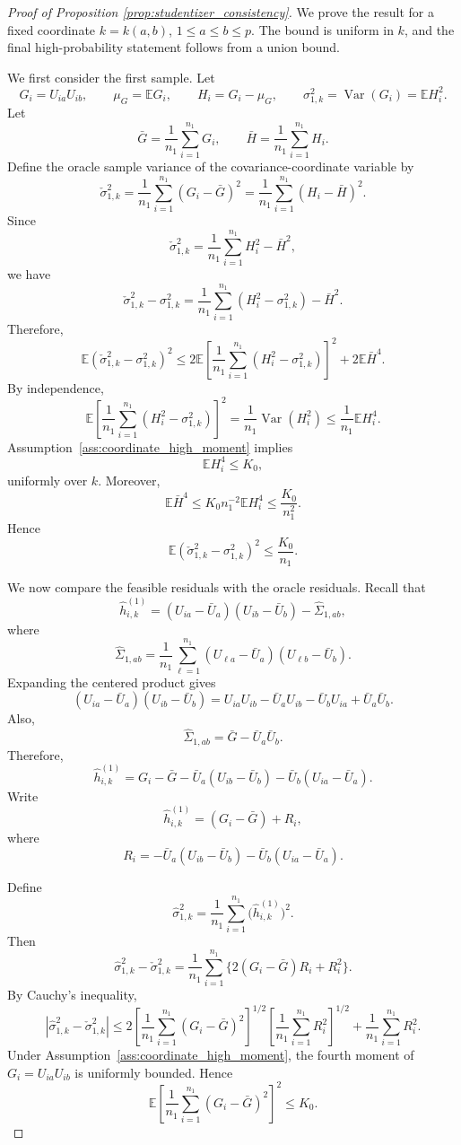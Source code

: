 \documentclass[
  12pt]{article}
\theoremstyle{plain}
\theoremstyle{definition}
\theoremstyle{remark}
\begin{document}
\begin{proof}[Proof of Proposition \ref{prop:studentizer_consistency}]
We prove the result for a fixed coordinate \(k=k(a,b)\), \(1\le a\le b\le p\).
The bound is uniform in \(k\), and the final high-probability statement follows
from a union bound.

We first consider the first sample. Let
\[
G_i=U_{ia}U_{ib},
\qquad
\mu_G=\mathbb E G_i,
\qquad
H_i=G_i-\mu_G,
\qquad
\sigma_{1,k}^2=\operatorname{Var}(G_i)=\mathbb E H_i^2.
\]
Let
\[
\bar G=\frac1{n_1}\sum_{i=1}^{n_1}G_i,
\qquad
\bar H=\frac1{n_1}\sum_{i=1}^{n_1}H_i.
\]
Define the oracle sample variance of the covariance-coordinate variable by
\[
\check\sigma_{1,k}^2
=
\frac1{n_1}\sum_{i=1}^{n_1}(G_i-\bar G)^2
=
\frac1{n_1}\sum_{i=1}^{n_1}(H_i-\bar H)^2.
\]
Since
\[
\check\sigma_{1,k}^2
=
\frac1{n_1}\sum_{i=1}^{n_1}H_i^2-\bar H^2,
\]
we have
\[
\check\sigma_{1,k}^2-\sigma_{1,k}^2
=
\frac1{n_1}\sum_{i=1}^{n_1}(H_i^2-\sigma_{1,k}^2)-\bar H^2.
\]
Therefore,
\[
\mathbb E
\left(
\check\sigma_{1,k}^2-\sigma_{1,k}^2
\right)^2
\le
2\mathbb E
\left[
\frac1{n_1}\sum_{i=1}^{n_1}(H_i^2-\sigma_{1,k}^2)
\right]^2
+
2\mathbb E\bar H^4.
\]
By independence,
\[
\mathbb E
\left[
\frac1{n_1}\sum_{i=1}^{n_1}(H_i^2-\sigma_{1,k}^2)
\right]^2
=
\frac1{n_1}\operatorname{Var}(H_i^2)
\le
\frac1{n_1}\mathbb E H_i^4.
\]
Assumption~\ref{ass:coordinate_high_moment} implies
\[
\mathbb E H_i^4\le K_0,
\]
uniformly over \(k\). Moreover,
\[
\mathbb E\bar H^4
\le
K_0 n_1^{-2}\mathbb E H_i^4
\le
\frac{K_0}{n_1^2}.
\]
Hence
\[
\mathbb E
\left(
\check\sigma_{1,k}^2-\sigma_{1,k}^2
\right)^2
\le
\frac{K_0}{n_1}.
\]

We now compare the feasible residuals with the oracle residuals. Recall that
\[
\widehat h_{i,k}^{(1)}
=
(U_{ia}-\bar U_a)(U_{ib}-\bar U_b)-\widehat\Sigma_{1,ab},
\]
where
\[
\widehat\Sigma_{1,ab}
=
\frac1{n_1}\sum_{\ell=1}^{n_1}
(U_{\ell a}-\bar U_a)(U_{\ell b}-\bar U_b).
\]
Expanding the centered product gives
\[
(U_{ia}-\bar U_a)(U_{ib}-\bar U_b)
=
U_{ia}U_{ib}
-\bar U_aU_{ib}
-\bar U_bU_{ia}
+\bar U_a\bar U_b.
\]
Also,
\[
\widehat\Sigma_{1,ab}
=
\bar G-\bar U_a\bar U_b.
\]
Therefore,
\[
\widehat h_{i,k}^{(1)}
=
G_i-\bar G
-
\bar U_a(U_{ib}-\bar U_b)
-
\bar U_b(U_{ia}-\bar U_a).
\]
Write
\[
\widehat h_{i,k}^{(1)}
=
(G_i-\bar G)+R_i,
\]
where
\[
R_i
=
-\bar U_a(U_{ib}-\bar U_b)
-
\bar U_b(U_{ia}-\bar U_a).
\]

Define
\[
\widehat\sigma_{1,k}^2
=
\frac1{n_1}\sum_{i=1}^{n_1}
\bigl(\widehat h_{i,k}^{(1)}\bigr)^2.
\]
Then
\[
\widehat\sigma_{1,k}^2-\check\sigma_{1,k}^2
=
\frac1{n_1}\sum_{i=1}^{n_1}
\{2(G_i-\bar G)R_i+R_i^2\}.
\]
By Cauchy's inequality,
\[
\left|
\widehat\sigma_{1,k}^2-\check\sigma_{1,k}^2
\right|
\le
2
\left[
\frac1{n_1}\sum_{i=1}^{n_1}(G_i-\bar G)^2
\right]^{1/2}
\left[
\frac1{n_1}\sum_{i=1}^{n_1}R_i^2
\right]^{1/2}
+
\frac1{n_1}\sum_{i=1}^{n_1}R_i^2.
\]
Under Assumption~\ref{ass:coordinate_high_moment}, the fourth moment of
\(G_i=U_{ia}U_{ib}\) is uniformly bounded. Hence
\[
\mathbb E
\left[
\frac1{n_1}\sum_{i=1}^{n_1}(G_i-\bar G)^2
\right]^2
\le K_0.
\]


\end{proof}
\end{document}
